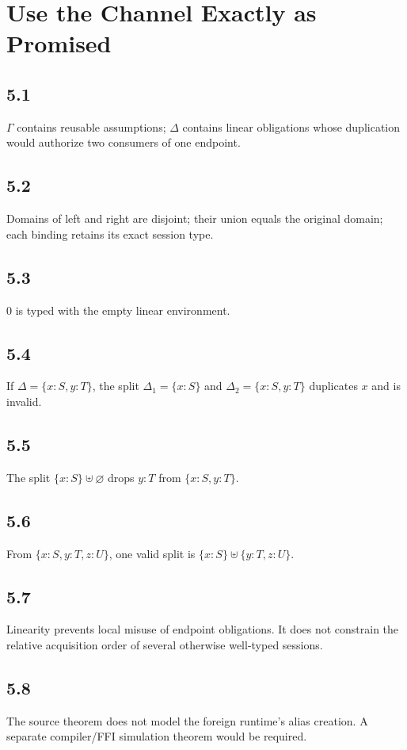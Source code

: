 \chapter{Use the Channel Exactly as Promised}

\section*{5.1}
$\Gamma$ contains reusable assumptions; $\Delta$ contains linear obligations whose duplication would authorize two consumers of one endpoint.

\section*{5.2}
Domains of left and right are disjoint; their union equals the original domain; each binding retains its exact session type.

\section*{5.3}
$0$ is typed with the empty linear environment.

\section*{5.4}
If $\Delta=\{x:S,y:T\}$, the split $\Delta_1=\{x:S\}$ and $\Delta_2=\{x:S,y:T\}$ duplicates $x$ and is invalid.

\section*{5.5}
The split $\{x:S\}\uplus\varnothing$ drops $y:T$ from $\{x:S,y:T\}$.

\section*{5.6}
From $\{x:S,y:T,z:U\}$, one valid split is $\{x:S\}\uplus\{y:T,z:U\}$.

\section*{5.7}
Linearity prevents local misuse of endpoint obligations. It does not constrain the relative acquisition order of several otherwise well-typed sessions.

\section*{5.8}
The source theorem does not model the foreign runtime's alias creation. A separate compiler/FFI simulation theorem would be required.

